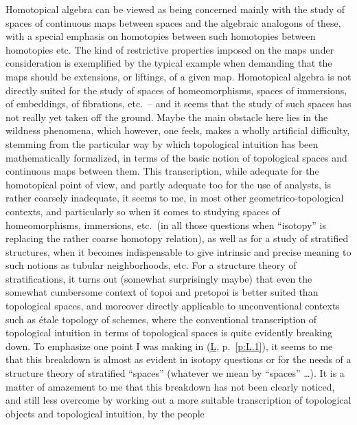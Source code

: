 %
\label{sec:14}%
Homotopical algebra can be viewed as being concerned mainly with the
study of spaces of continuous maps between spaces and the algebraic
analogons of these, with a special emphasis on homotopies between such
homotopies between homotopies etc. The kind of restrictive properties
imposed on the maps under consideration is exemplified by the typical
example when demanding that the maps should be extensions, or
liftings, of a given map. Homotopical algebra is not directly suited
for the study of spaces of homeomorphisms, spaces of immersions, of
embeddings, of fibrations, etc.\ -- and it seems that the study of
such spaces has not really yet taken off the ground. Maybe the main
obstacle here lies in the wildness phenomena, which however, one
feels, makes a wholly artificial difficulty, stemming from the
particular way by which topological intuition has been mathematically
formalized, in terms of the basic notion of topological spaces and
continuous maps between them. This transcription, while adequate for
the homotopical point of view, and partly adequate too for the use of
analysts, is rather coarsely inadequate, it seems to me, in most other
geometrico-topological contexts, and particularly so when it comes to
studying spaces of homeomorphisms, immersions, etc.\ (in all those
questions when ``isotopy'' is replacing the rather coarse homotopy
relation), as well as for a study of stratified structures, when it
becomes indispensable to give intrinsic and precise meaning to such
notions as tubular neighborhoods, etc.  For a structure theory of
stratifications, it turns out (somewhat surprisingly maybe) that even
the somewhat cumbersome context of topoi and pretopoi is better suited
than topological spaces, and moreover directly applicable to
unconventional contexts such as \'etale topology of schemes, where the
conventional transcription of topological intuition in terms of
topological spaces is quite evidently breaking down. To emphasize one
point I was making in (\hyperref[ch:I]{L}, p.~\ref{p:L.1}), it
seems to me that this breakdown is almost as evident in isotopy
questions or for the needs of a structure theory of stratified
``spaces'' (whatever we mean by ``spaces'' \ldots). It is a matter of
amazement to me that this breakdown has not been clearly noticed, and
still less overcome by working out a more suitable transcription of
topological objects and topological intuition, by the people
